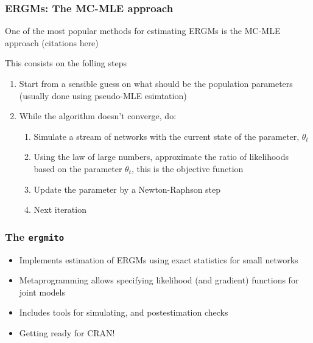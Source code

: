 \documentclass[aspectratio=169, 9pt, handout]{beamer}\usepackage[]{graphicx}\usepackage[]{color}
\newcommand{\ergmitopkg}[0]{\texttt{ergmito}}
\begin{document}
\begin{frame}[label=mcmle]
\frametitle{ERGMs: The MC-MLE approach}

One of the most popular methods for estimating ERGMs is the MC-MLE approach (citations here)

This consists on the folling steps

\begin{enumerate}
\item Start from a sensible guess on what should be the population parameters
(usually done using pseudo-MLE esimtation)
\item While the algorithm doesn't converge, do:
  \begin{enumerate}
  \item Simulate a stream of networks with the current state of the parameter,
  $\theta_t$
  \item Using the law of large numbers, approximate the ratio of likelihoods 
  based on the parameter $\theta_t$, this is the objective function
  \item Update the parameter by a Newton-Raphson step
  \item Next iteration
  \end{enumerate}
\end{enumerate}

\vfill\hfill \hyperlink{art}{}


\end{frame}

\begin{frame}[label=ergmitopkg]
\frametitle{The \ergmitopkg{}}

\begin{itemize}
\item Implements estimation of ERGMs using exact statistics for small networks
\item Metaprogramming allows specifying likelihood (and gradient) functions for
joint models
\item Includes tools for simulating, and postestimation checks
\item Getting ready for CRAN!
\end{itemize}

\vfill\hfill \hyperlink{ergmito}{}

\end{frame}
\end{document}
